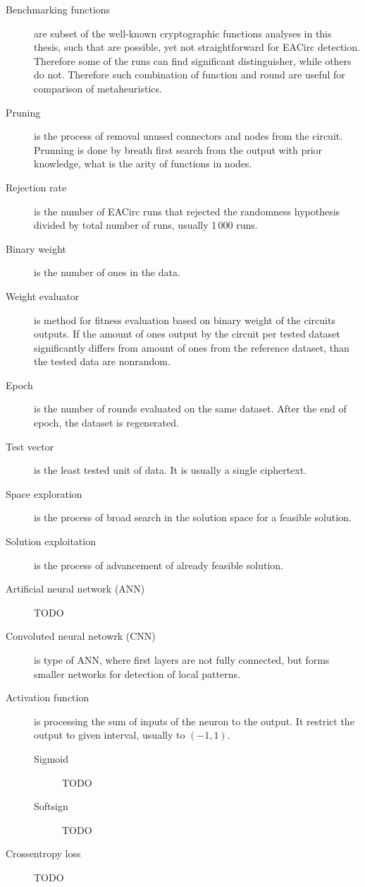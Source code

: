\documentclass[
  print, %
  Table,   %
  nolof,     %
  nolot,     %
  11pt, %
  oneside  %
]{fithesis3}
\begin{document}
\begin{description}
    \item[Benchmarking functions] are subset of the well-known cryptographic functions analyses in this thesis, such that are possible, yet not straightforward for EACirc detection. Therefore some of the runs can find significant distinguisher, while others do not. Therefore such combination of function and round are useful for comparison of metaheuristics.
    \item[Pruning] is the process of removal unused connectors and nodes from the circuit. Prunning is done by breath first search from the output with prior knowledge, what is the arity of functions in nodes.
    \item[Rejection rate] is the number of EACirc runs that rejected the randomness hypothesis divided by total number of runs, usually 1\,000 runs.
    \item[Binary weight] is the number of ones in the data.
    \item[Weight evaluator] is method for fitness evaluation based on binary weight of the circuits outputs. If the amount of ones output by the circuit per tested dataset significantly differs from amount of ones from the reference dataset, than the tested data are nonrandom.
    \item[Epoch] is the number of rounds evaluated on the same dataset. After the end of epoch, the dataset is regenerated.
    \item[Test vector] is the least tested unit of data. It is usually a single ciphertext.
    \item[Space exploration] is the process of broad search in the solution space for a feasible solution.
    \item[Solution exploitation] is the process of advancement of already feasible solution.

    \item[Artificial neural network (ANN)] TODO
    \item[Convoluted neural netowrk (CNN)] is type of ANN, where first layers are not fully connected, but forms smaller networks for detection of local patterns.
    \item[Activation function] is processing the sum of inputs of the neuron to the output. It restrict the output to given interval, usually to $(-1, 1)$.
    \begin{description}
        \item[Sigmoid] TODO
        \item[Softsign] TODO
    \end{description}
    \item[Crossentropy loss] TODO


\end{description}
\end{document}
